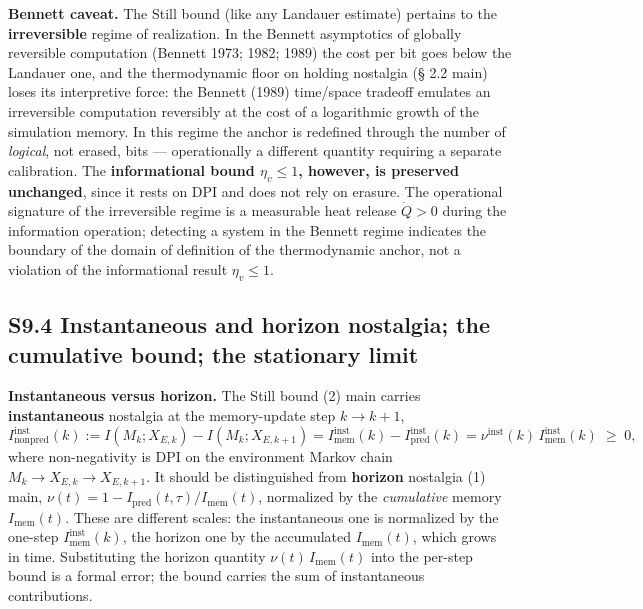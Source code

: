 \documentclass[pdflatex,sn-mathphys-ay]{sn-jnl}
\begin{document}
\textbf{Bennett caveat.} The Still bound (like any Landauer estimate) pertains to the \textbf{irreversible} regime of realization. In the Bennett asymptotics of globally reversible computation (Bennett 1973; 1982; 1989) the cost per bit goes below the Landauer one, and the thermodynamic floor on holding nostalgia (§ 2.2 main) loses its interpretive force: the Bennett (1989) time/space tradeoff emulates an irreversible computation reversibly at the cost of a logarithmic growth of the simulation memory. In this regime the anchor is redefined through the number of \emph{logical}, not erased, bits --- operationally a different quantity requiring a separate calibration. The \textbf{informational bound \(\eta_v \le 1\), however, is preserved unchanged}, since it rests on DPI and does not rely on erasure. The operational signature of the irreversible regime is a measurable heat release \(\dot Q > 0\) during the information operation; detecting a system in the Bennett regime indicates the boundary of the domain of definition of the thermodynamic anchor, not a violation of the informational result \(\eta_v \le 1\).



\subsection*{S9.4 Instantaneous and horizon nostalgia; the cumulative bound; the stationary limit}\label{s9.4-instantaneous-and-horizon-nostalgia-the-cumulative-bound-the-stationary-limit}



\textbf{Instantaneous versus horizon.} The Still bound (2) main carries \textbf{instantaneous} nostalgia at the memory-update step \(k \to k+1\), \[I_{\text{nonpred}}^{\text{inst}}(k) := I(M_k; X_{E,k}) - I(M_k; X_{E,k+1}) = I_{\text{mem}}^{\text{inst}}(k) - I_{\text{pred}}^{\text{inst}}(k) = \nu^{\text{inst}}(k)\, I_{\text{mem}}^{\text{inst}}(k) \;\ge\; 0,\] where non-negativity is DPI on the environment Markov chain \(M_k \to X_{E,k} \to X_{E,k+1}\). It should be distinguished from \textbf{horizon} nostalgia (1) main, \(\nu(t) = 1 - I_{\text{pred}}(t,\tau)/I_{\text{mem}}(t)\), normalized by the \emph{cumulative} memory \(I_{\text{mem}}(t)\). These are different scales: the instantaneous one is normalized by the one-step \(I_{\text{mem}}^{\text{inst}}(k)\), the horizon one by the accumulated \(I_{\text{mem}}(t)\), which grows in time. Substituting the horizon quantity \(\nu(t)\, I_{\text{mem}}(t)\) into the per-step bound is a formal error; the bound carries the sum of instantaneous contributions.
\end{document}
